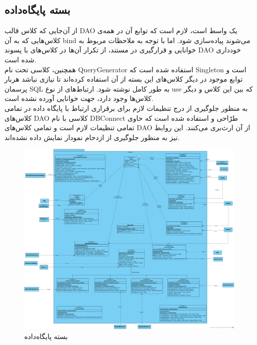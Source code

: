 \begin{landscape}
\section{بسته پایگاه‌داده}
از آن‌جایی که کلاس قالب
 DAO یک واسط است، لازم است که توابع آن در همه‌ی کلاس‌هایی که به آن bind می‌شوند پیاده‌سازی شود. اما با توجه به ملاحظات مربوط به خوانایی و قرارگیری در مستند، از تکرار آن‌ها در کلاس‌های با پسوند DAO خودداری شده است.
 \\
 همچنین، کلاسی تحت نام QueryGenerator استفاده شده است که Singleton است و توابع موجود در دیگر کلاس‌های این بسته از آن استفاده کرده‌اند تا نیازی نباشد هربار پرسمان SQL به طور کامل نوشته شود. ارتباط‌های از نوع use که بین این کلاس و دیگر کلاس‌ها وجود دارد، جهت خوانایی آورده نشده است.\\
 به منظور جلوگیری از درج تنظیمات لازم برای برقراری ارتباط با پایگاه داده در تمامی کلاس‌های DAO کلاسی با نام DBConnect طرّاحی و استفاده شده است که حاوی تمامی تنظیمات لازم است و تمامی کلاس‌های DAO از آن ارث‌بری می‌کنند. این روابط نیز به منظور جلوگیری از ازدحام نمودار نمایش داده نشده‌اند.
\begin{figure}[H]
	\centering
	\includegraphics[scale=0.3]{img/class-design/DatabasePackage}
	\caption{بسته پایگاه‌داده}
\end{figure}
\end{landscape}


